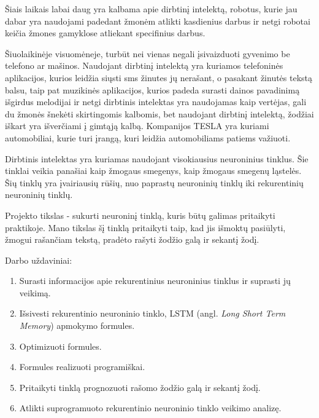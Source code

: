 Šiais laikais labai daug yra kalbama apie dirbtinį intelektą, robotus, kurie jau dabar yra naudojami padedant žmonėm atlikti kasdienius darbus ir netgi robotai keičia žmones gamyklose atliekant specifinius darbus.

Šiuolaikinėje visuomėneje, turbūt nei vienas negali įsivaizduoti gyvenimo be telefono ar mašinos. Naudojant dirbtinį intelektą yra kuriamos telefoninės aplikacijos, kurios leidžia siųsti sms žinutes jų nerašant, o pasakant žinutės tekstą balsu, taip pat muzikinės aplikacijos, kurios padeda surasti dainos pavadinimą išgirdus melodijai ir netgi dirbtinis intelektas yra naudojamas kaip vertėjas, gali du žmonės šnekėti skirtingomis kalbomis, bet naudojant dirbtinį intelektą, žodžiai iškart yra išverčiami į gimtąją kalbą. Kompanijos TESLA yra kuriami automobiliai, kurie turi įrangą, kuri leidžia automobiliams patiems važiuoti.

Dirbtinis intelektas yra kuriamas naudojant visokiausius neuroninius tinklus. Šie tinklai veikia panašiai kaip žmogaus smegenys, kaip žmogaus smegenų ląstelės. Šių tinklų yra įvairiausių rūšių, nuo paprastų neuroninių tinklų iki rekurentinių neuroninių tinklų.

Projekto tikslas - sukurti neuroninį tinklą, kuris būtų galimas pritaikyti praktikoje. Mano tikslas šį tinklą pritaikyti taip, kad jis išmoktų pasiūlyti, žmogui rašančiam tekstą, pradėto rašyti žodžio galą ir sekantį žodį.

Darbo uždaviniai:

\begin{enumerate}
  \item Surasti informacijos apie rekurentinius neuroninius tinklus ir suprasti jų veikimą.
  \item Išsivesti rekurentinio neuroninio tinklo, LSTM (angl. \textit{Long Short Term Memory}) apmokymo formules.
  \item Optimizuoti formules.
  \item Formules realizuoti programiškai.
  \item Pritaikyti tinklą prognozuoti rašomo žodžio galą ir sekantį žodį.
  \item Atlikti suprogramuoto rekurentinio neuroninio tinklo veikimo analizę.
\end{enumerate}

\clearpage
